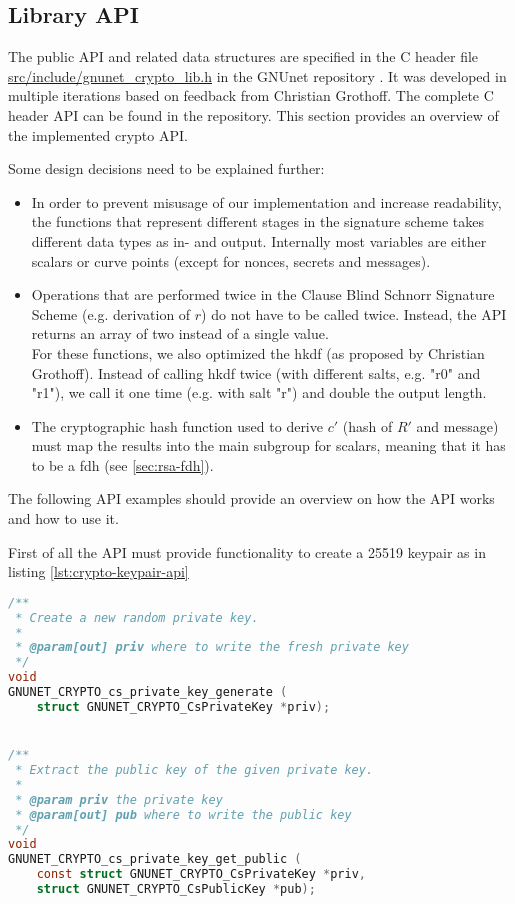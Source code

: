 \subsection{Library API}
The public \ac{API} and related data structures are specified in the C header file \url{src/include/gnunet_crypto_lib.h} in the GNUnet repository \cite{gnunet-git}.
It was developed in multiple iterations based on feedback from Christian Grothoff.
The complete C header \ac{API} can be found in the repository.
This section provides an overview of the implemented crypto API.

Some design decisions need to be explained further:
\begin{itemize}
  \item In order to prevent misusage of our implementation and increase readability, the functions that represent different stages in the signature scheme takes different data types as in- and output.
        Internally most variables are either scalars or curve points (except for nonces, secrets and messages).
  \item Operations that are performed twice in the Clause Blind Schnorr Signature Scheme (e.g. derivation of $ r $) do not have to be called twice.
        Instead, the API returns an array of two instead of a single value.\\
        For these functions, we also optimized the \gls{hkdf} (as proposed by Christian Grothoff).
        Instead of calling \gls{hkdf} twice (with different salts, e.g. "r0" and "r1"), we call it one time (e.g. with salt "r") and double the output length.
  \item The cryptographic hash function used to derive $ c' $ (hash of $ R' $ and message) must map the results into the main subgroup for scalars, meaning that it has to be a \gls{fdh} (see \ref{sec:rsa-fdh}).
\end{itemize}

The following API examples should provide an overview on how the API works and how to use it.

First of all the API must provide functionality to create a \gls{25519} keypair as in listing \ref{lst:crypto-keypair-api}

\begin{lstlisting}[style=bfh-c,language=C, caption={GNUnet create keypair API}, label={lst:crypto-keypair-api}]
/**
 * Create a new random private key.
 *
 * @param[out] priv where to write the fresh private key
 */
void
GNUNET_CRYPTO_cs_private_key_generate (
    struct GNUNET_CRYPTO_CsPrivateKey *priv);


/**
 * Extract the public key of the given private key.
 *
 * @param priv the private key
 * @param[out] pub where to write the public key
 */
void
GNUNET_CRYPTO_cs_private_key_get_public (
    const struct GNUNET_CRYPTO_CsPrivateKey *priv,
    struct GNUNET_CRYPTO_CsPublicKey *pub);
\end{lstlisting}

